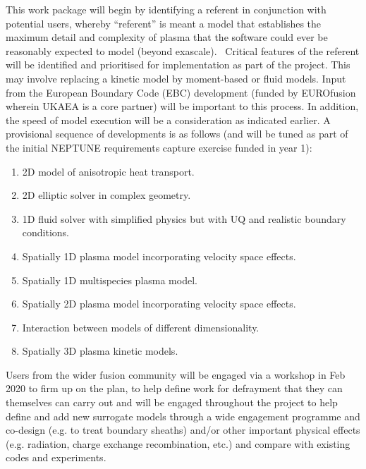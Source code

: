\documentclass[a4paper]{article}
\newcommand\liststyleWWNumx{%
\renewcommand\theenumi{\arabic{enumi}}
\renewcommand\theenumii{\alph{enumii}}
\renewcommand\theenumiii{\roman{enumiii}}
\renewcommand\theenumiv{\arabic{enumiv}}
\renewcommand\labelenumi{\theenumi.}
\renewcommand\labelenumii{\theenumii.}
\renewcommand\labelenumiii{\theenumiii.}
\renewcommand\labelenumiv{\theenumiv.}
}
\begin{document}
\bigskip

This work package will begin by identifying a referent in conjunction with potential users, whereby ``referent'' is
meant a model that establishes the maximum detail and complexity of plasma that the software could ever be reasonably
expected to model (beyond exascale). \ Critical features of the referent will be identified and prioritised for
implementation as part of the project. This may involve replacing a kinetic model by moment-based or fluid models.
Input from the European Boundary Code (EBC) development (funded by EUROfusion wherein UKAEA is a core partner) will be
important to this process. In addition, the speed of model execution will be a consideration as indicated earlier. A
provisional sequence of developments is as follows (and will be tuned as part of the initial NEPTUNE requirements
capture exercise funded in year 1):


\bigskip

\liststyleWWNumx
\begin{enumerate}
\item 2D model of anisotropic heat transport.
\item 2D elliptic solver in complex geometry.
\item 1D fluid solver with simplified physics but with UQ and realistic boundary conditions.
\item Spatially 1D plasma model incorporating velocity space effects.
\item Spatially 1D multispecies plasma model.
\item Spatially 2D plasma model incorporating velocity space effects.
\item Interaction between models of different dimensionality.
\item Spatially 3D plasma kinetic models.
\end{enumerate}

\bigskip

Users from the wider fusion community will be engaged via a workshop in Feb 2020 to firm up on the plan, to help define
work for defrayment that they can themselves can carry out and will be engaged throughout the project to help define
and add new surrogate models through a wide engagement programme and co-design (e.g. to treat boundary sheaths) and/or
other important physical effects (e.g. radiation, charge exchange recombination, etc.) and compare with existing codes
and experiments. 

\subsection[]{\rmfamily\bfseries }
\end{document}
